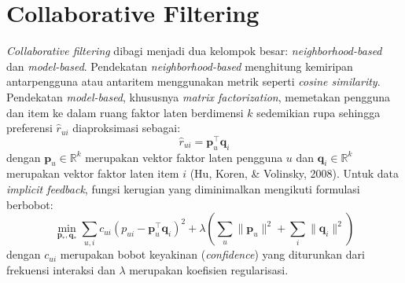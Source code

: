 \section{Collaborative Filtering}
\emph{Collaborative filtering} dibagi menjadi dua kelompok besar:
\emph{neighborhood-based} dan \emph{model-based}. Pendekatan
\emph{neighborhood-based} menghitung kemiripan antarpengguna atau antaritem
menggunakan metrik seperti \emph{cosine similarity}. Pendekatan
\emph{model-based}, khususnya \emph{matrix factorization}, memetakan
pengguna dan item ke dalam ruang faktor laten berdimensi $k$ sedemikian
rupa sehingga preferensi $\hat{r}_{ui}$ diaproksimasi sebagai:
\begin{equation}
\hat{r}_{ui} = \mathbf{p}_u^{\top} \mathbf{q}_i
\label{eq:mf}
\end{equation}
dengan $\mathbf{p}_u \in \mathbb{R}^k$ merupakan vektor faktor laten
pengguna $u$ dan $\mathbf{q}_i \in \mathbb{R}^k$ merupakan vektor faktor
laten item $i$ (Hu, Koren, \& Volinsky, 2008). Untuk data \emph{implicit
feedback}, fungsi kerugian yang diminimalkan mengikuti formulasi berbobot:
\begin{equation}
\min_{\mathbf{p}_*, \mathbf{q}_*} \sum_{u,i} c_{ui}\left(p_{ui} -
\mathbf{p}_u^{\top}\mathbf{q}_i\right)^2 + \lambda\left(\sum_u
\lVert\mathbf{p}_u\rVert^2 + \sum_i \lVert\mathbf{q}_i\rVert^2\right)
\label{eq:loss}
\end{equation}
dengan $c_{ui}$ merupakan bobot keyakinan (\emph{confidence}) yang
diturunkan dari frekuensi interaksi dan $\lambda$ merupakan koefisien
regularisasi.
